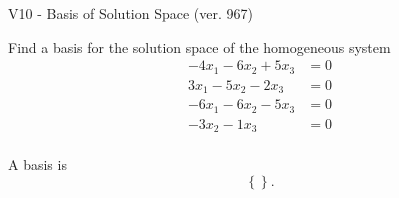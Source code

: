 \begin{exercise}
  \begin{exerciseTitle}V10 - Basis of Solution Space (ver. 967)\end{exerciseTitle}
  \begin{exerciseStatement}
    Find a basis for the solution space of the homogeneous system 
\begin{align*}
 -4 x_ 1 -6 x_ 2 + 5 x_ 3 &= 0  \\ 
  3 x_ 1 -5 x_ 2 -2 x_ 3 &= 0  \\ 
  -6 x_ 1 -6 x_ 2 -5 x_ 3 &= 0  \\ 
  -3 x_ 2 -1 x_ 3 &= 0  \\ 
 \end{align*}


 
  \end{exerciseStatement}

  \begin{exerciseAnswer}
   A basis is   
\[\left\{\right\}.\]

  


  \end{exerciseAnswer}
\end{exercise}